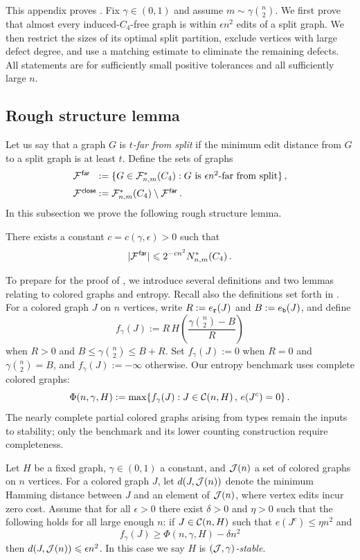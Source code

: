 This appendix proves . Fix $\gamma\in(0,1)$ and assume $m\sim\gamma\binom{n}{2}$. We first prove that almost every induced-$C_4$-free graph is within $\epsilon n^2$ edits of a split graph. We then restrict the sizes of its optimal split partition, exclude vertices with large defect degree, and use a matching estimate to eliminate the remaining defects. All statements are for sufficiently small positive tolerances and all sufficiently large $n$.

\subsection{Rough structure lemma}
Let us say that a graph $G$ is \emph{$t$-far from split} if the minimum edit distance from $G$ to a split graph is at least $t$. Define the sets of graphs
\[\arraycolsep=0.4mm
\begin{array}{ll}
\cF^\far &:= \{G\in\cF^\ast_{n,m}(C_4):\text{$G$ is $\epsilon n^2$-far from split}\} \,, \\[6pt]
\cF^\close &:= \cF^\ast_{n,m}(C_4)\setminus\cF^\far \,.
\end{array}\]
In this subsection we prove the following rough structure lemma.

\begin{lemma}\label{lemma:c4-rough-struc}
There exists a constant $c=c(\gamma,\epsilon)>0$ such that
$$|{\mathcal F}^{\hspace{0.2mm}\mathsf{far}}|\leqslant 2^{-cn^2}N^\ast_{n,m}(C_4)\,.$$
\end{lemma}

To prepare for the proof of , we introduce several definitions and two lemmas relating to colored graphs and entropy. Recall also the definitions set forth in .
For a colored graph $J$ on $n$ vertices, write $R:=e_{\normalfont\texttt r}(J)$ and $B:=e_{\normalfont\texttt b}(J)$, and define
$$f_\gamma(J):=R\,H\!\left(\frac{\gamma\binom{n}{2}-B}{R}\right)$$
when $R>0$ and $B\leq\gamma\binom{n}{2}\leq B+R$. Set $f_\gamma(J):=0$ when $R=0$ and $\gamma\binom{n}{2}=B$, and $f_\gamma(J):=-\infty$ otherwise. Our entropy benchmark uses complete colored graphs:
\begin{equation}\label{eqn:coloring-entropy-0}
\Phi(n,\gamma,H):=\max\{f_\gamma(J):J\in{\mathcal C}(n,H)\,,\,e(J^c)=0\}\,.
\end{equation}
The nearly complete partial colored graphs arising from types remain the inputs to stability; only the benchmark and its lower counting construction require completeness.

\begin{definition}[Stability]\label{dfn:Jgamma-stable}
Let $H$ be a fixed graph, $\gamma\in(0,1)$ a constant, and ${\mathcal J}(n)$ a set of colored graphs on $n$ vertices. For a colored graph $J$, let $d(J,{\mathcal J}(n))$ denote the minimum Hamming distance between $J$ and an element of ${\mathcal J}(n)$, where vertex edits incur zero cost. Assume that for all $\epsilon>0$ there exist $\delta>0$ and $\eta>0$ such that the following holds for all large enough $n$: if $J\in{\mathcal C}(n,H)$ such that $e(J^c)\leq\eta n^2$ and
$$f_\gamma(J)\geq\Phi(n,\gamma,H)-\delta n^2$$
then $d(J,{\mathcal J}(n))\leqslant\epsilon n^2$. In this case we say $H$ is \emph{$({\mathcal J},\gamma)$-stable}.
\end{definition}

